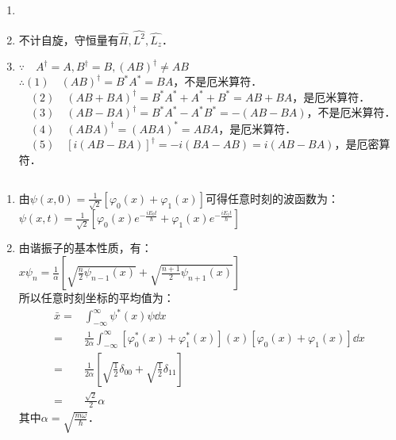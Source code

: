 
\begin{issues}
\issueDraft
\issueTODO
\end{issues}


\subsection{ }
\begin{enumerate}
\item 
\item 不计自旋，守恒量有$\hat H,\hat {L^2},\hat {L_z} $．
\item $\because \quad A^{\dagger} = A,B^{\dagger} = B,(AB)^{\dagger} \neq AB $ \\
$\therefore (1)\quad (AB)^{\dagger} = B^*A^* = BA $，不是厄米算符． \\
$\quad (2)\quad (AB+BA)^{\dagger} = B^*A^*+A^*+B^* = AB+BA $，是厄米算符． \\
$\quad (3)\quad (AB-BA)^{\dagger} = B^*A^*-A^*B^* = -(AB-BA) $，不是厄米算符． \\
$\quad (4)\quad (ABA)^{\dagger} = (ABA)^* = ABA $，是厄米算符． \\
$\quad (5)\quad [i(AB-BA)]^{\dagger} = -i(BA-AB) = i(AB-BA) $，是厄密算符．
\end{enumerate}
\subsection{ }
\begin{enumerate}
\item 由$\psi (x,0) = \frac{1}{\sqrt{2}}[\varphi_{0}(x) + \varphi_{1}(x)] $可得任意时刻的波函数为：\\
$\displaystyle \psi(x,t) = \frac{1}{\sqrt{2}}\left[\varphi_{0}(x)e^{-\frac{iE_{0}t}{\hbar}} + \varphi_{1}(x)e^{-\frac{iE_{1}t}{\hbar}} \right] $
\item 由谐振子的基本性质，有：\\
$x\psi_{n} = \frac{1}{\alpha} \left[\sqrt{\frac{n}{2}\psi_{n-1}(x)} + \sqrt{\frac{n+1}{2}\psi_{n+1}(x)} \right] $ \\
所以任意时刻坐标的平均值为：\\
\begin{equation}
\begin{aligned}
\bar{x} =& \int^{\infty}_{-\infty} \psi^{*}(x)\psi \dd{x} \\
=& \frac{1}{2\alpha} \int^{\infty}_{-\infty} \left[\varphi^{*}_{0}(x)+\varphi^{*}_{1}(x)\right](x)\left[\varphi_{0}(x)+\varphi_{1}(x)\right] \dd{x} \\
=& \frac{1}{2\alpha} \left[\sqrt{\frac{1}{2}}\delta_{00}+\sqrt{\frac{1}{2}}\delta_{11} \right] \\
=& \frac{\sqrt{2}}{2} \alpha
\end{aligned}
\end{equation}
其中$\alpha = \sqrt{\frac{m\omega}{\hbar}} $．
\end{enumerate}

